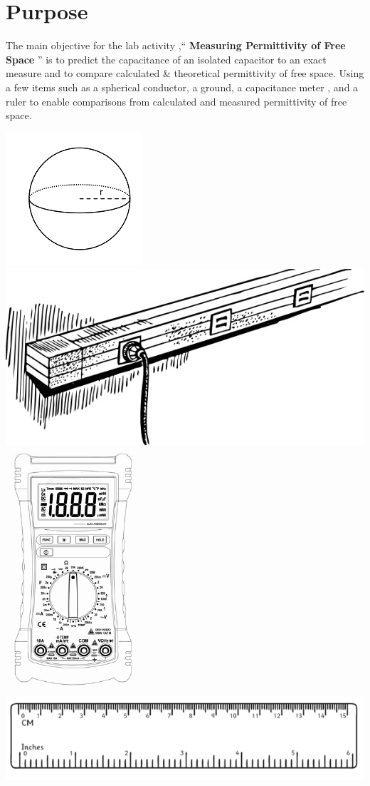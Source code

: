\documentclass{article}
\begin{document}
\section*{Purpose}
The main objective for the lab activity ,``\textbf{ Measuring Permittivity of Free Space} '' is to predict the capacitance of an isolated capacitor to an exact measure and to compare calculated \& theoretical permittivity of free space. Using a few items such as a spherical conductor, a ground, a capacitance meter , and a ruler to enable comparisons from calculated and measured permittivity of free space.

\includegraphics[scale=.7]{Images/sphere.png}
\includegraphics[scale=.2]{Images/powerstrip.jpg}
\includegraphics[scale=.35]{Images/meter.png}
\includegraphics[scale=.3]{Images/ruler.png}
\vspace{1cm}
\end{document}
